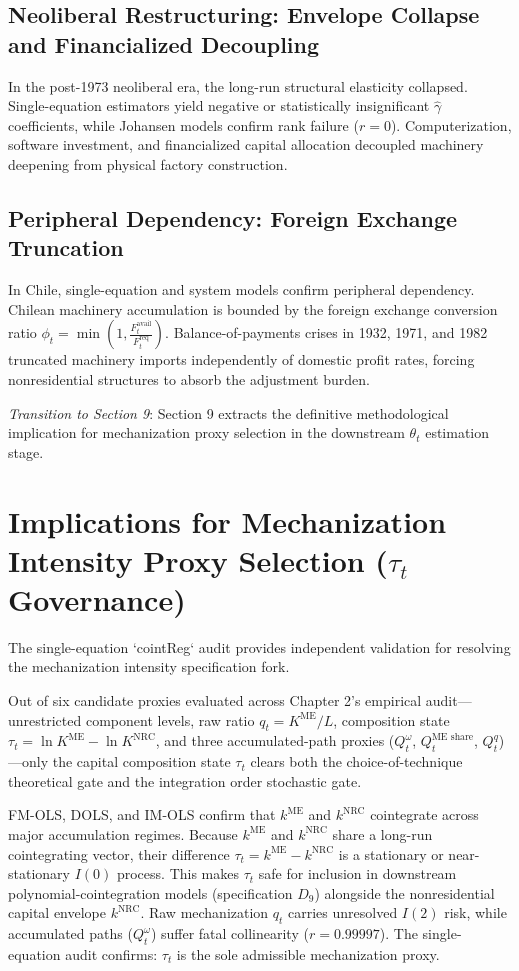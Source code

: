\documentclass[11pt,a4paper]{article}
\begin{document}
\subsection{Neoliberal Restructuring: Envelope Collapse and Financialized Decoupling}
In the post-1973 neoliberal era, the long-run structural elasticity collapsed. Single-equation estimators yield negative or statistically insignificant $\hat{\gamma}$ coefficients, while Johansen models confirm rank failure ($r=0$). Computerization, software investment, and financialized capital allocation decoupled machinery deepening from physical factory construction.

\subsection{Peripheral Dependency: Foreign Exchange Truncation}
In Chile, single-equation and system models confirm peripheral dependency. Chilean machinery accumulation is bounded by the foreign exchange conversion ratio $\phi_t = \min\left(1, \frac{F_t^{\text{avail}}}{F_t^{\text{req}}}\right)$. Balance-of-payments crises in 1932, 1971, and 1982 truncated machinery imports independently of domestic profit rates, forcing nonresidential structures to absorb the adjustment burden.

\textit{Transition to Section 9}: Section 9 extracts the definitive methodological implication for mechanization proxy selection in the downstream $\theta_t$ estimation stage.

\FloatBarrier
\section{Implications for Mechanization Intensity Proxy Selection ($\tau_t$ Governance)}

The single-equation `cointReg` audit provides independent validation for resolving the mechanization intensity specification fork.

Out of six candidate proxies evaluated across Chapter 2's empirical audit---unrestricted component levels, raw ratio $q_t = K^{\text{ME}}/L$, composition state $\tau_t = \ln K^{\text{ME}} - \ln K^{\text{NRC}}$, and three accumulated-path proxies ($Q_t^\omega$, $Q_t^{\text{ME share}}$, $Q_t^q$)---only the capital composition state $\tau_t$ clears both the choice-of-technique theoretical gate and the integration order stochastic gate.

FM-OLS, DOLS, and IM-OLS confirm that $k^{\text{ME}}$ and $k^{\text{NRC}}$ cointegrate across major accumulation regimes. Because $k^{\text{ME}}$ and $k^{\text{NRC}}$ share a long-run cointegrating vector, their difference $\tau_t = k^{\text{ME}} - k^{\text{NRC}}$ is a stationary or near-stationary $I(0)$ process. This makes $\tau_t$ safe for inclusion in downstream polynomial-cointegration models (specification $D_9$) alongside the nonresidential capital envelope $k^{\text{NRC}}$. Raw mechanization $q_t$ carries unresolved $I(2)$ risk, while accumulated paths ($Q_t^\omega$) suffer fatal collinearity ($r = 0.99997$). The single-equation audit confirms: $\tau_t$ is the sole admissible mechanization proxy.
\end{document}
